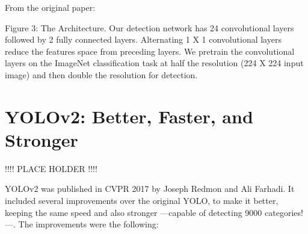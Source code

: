 \documentclass{article}
\begin{document}
From the original paper:

Figure 3: The Architecture. Our detection network has 24 convolutional layers followed by 2 fully connected layers. Alternating 1 X 1 convolutional layers reduce the features space from preceding layers. We pretrain the convolutional layers on the ImageNet classification task at half the resolution (224 X 224 input image) and then double the resolution for detection.



\section{YOLOv2: Better, Faster, and Stronger}

!!!! PLACE HOLDER !!!!

YOLOv2 was published in CVPR 2017 \cite{redmon2017yolo9000} by Joseph Redmon and Ali Farhadi. It included several improvements over the original YOLO, to make it better, keeping the same speed and also stronger —capable of detecting 9000 categories!—. The improvements were the following:
\end{document}
